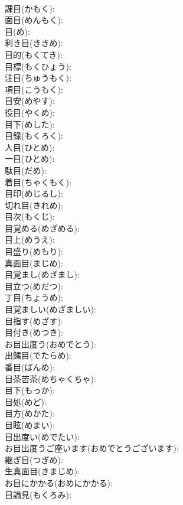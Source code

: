 \documentclass[8pt]{extreport}
\begin{document}
\begin{CJK}{UTF8}{min}
\\	課目(かもく): 
\\	面目(めんもく): 
\\	目(め): 
\\	利き目(ききめ): 
\\	目的(もくてき): 
\\	目標(もくひょう): 
\\	注目(ちゅうもく): 
\\	項目(こうもく): 
\\	目安(めやす): 
\\	役目(やくめ): 
\\	目下(めした): 
\\	目録(もくろく): 
\\	人目(ひとめ): 
\\	一目(ひとめ): 
\\	駄目(だめ): 
\\	着目(ちゃくもく): 
\\	目印(めじるし): 
\\	切れ目(きれめ): 
\\	目次(もくじ): 
\\	目覚める(めざめる): 
\\	目上(めうえ): 
\\	目盛り(めもり): 
\\	真面目(まじめ): 
\\	目覚まし(めざまし): 
\\	目立つ(めだつ): 
\\	丁目(ちょうめ): 
\\	目覚ましい(めざましい): 
\\	目指す(めざす): 
\\	目付き(めつき): 
\\	お目出度う(おめでとう): 
\\	出鱈目(でたらめ): 
\\	番目(ばんめ): 
\\	目茶苦茶(めちゃくちゃ): 
\\	目下(もっか): 
\\	目処(めど): 
\\	目方(めかた): 
\\	目眩(めまい): 
\\	目出度い(めでたい): 
\\	お目出度うご座います(おめでとうございます): 
\\	継ぎ目(つぎめ): 
\\	生真面目(きまじめ): 
\\	お目にかかる(おめにかかる): 
\\	目論見(もくろみ): 

\end{CJK}
\end{document}

